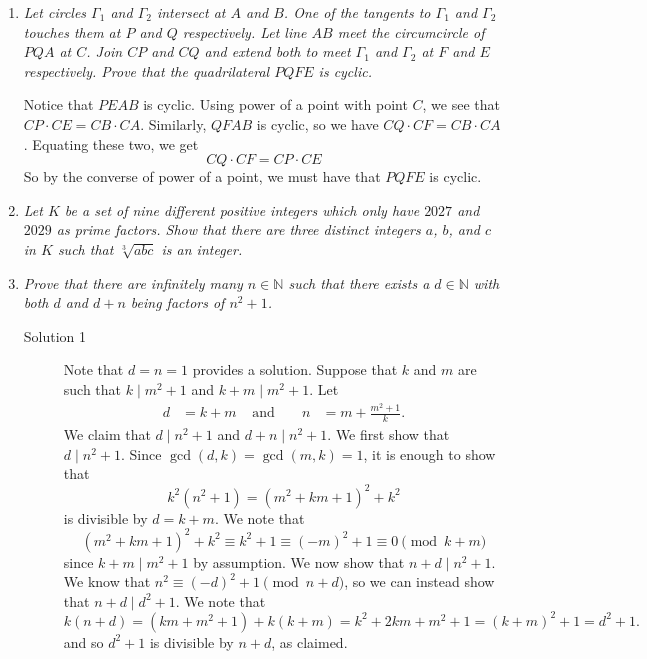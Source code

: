 \documentclass{article}
\begin{document}
\begin{enumerate}[1.]
  
  \item %
  {\itshape Let circles $\Gamma_1$ and $\Gamma_2$ intersect at $A$ and $B$. One of the tangents to $\Gamma_1$ and $\Gamma_2$ touches them at $P$ and $Q$ respectively. Let line $AB$ meet the circumcircle of $PQA$ at $C$. Join $CP$ and $CQ$ and extend both to meet $\Gamma_1$ and $\Gamma_2$ at $F$ and $E$ respectively. Prove that the quadrilateral $PQFE$ is cyclic.}
  
  Notice that $PEAB$ is cyclic. Using power of a point with point $C$, we see that $CP \cdot CE = CB \cdot CA$. Similarly, $QFAB$ is cyclic, so we have $CQ \cdot CF = CB \cdot CA$. Equating these two, we get 
  $$CQ \cdot CF = CP \cdot CE $$
  So by the converse of power of a point, we must have that $PQFE$ is cyclic.
  
  \item %
  {\itshape Let $K$ be a set of nine different positive integers which only have $2027$ and $2029$ as prime factors.
  Show that there are three distinct integers $a$, $b$, and $c$ in $K$ such that $\sqrt[3]{abc}$ is an integer.}
  
  
  \item %
  {\itshape Prove that there are infinitely many $n \in \mathbb{N}$ such that there exists a $d \in \mathbb{N}$ with both $d$ and $d + n$ being factors of $n^2 + 1$.}
  
  \begin{description}
    \item[Solution 1] Note that $d = n = 1$ provides a solution. Suppose that $k$ and $m$ are such that $k \mid m^2 + 1$ and $k + m \mid m^2 + 1$. Let
    \begin{align*}
      d & = k + m & \text{ and } && n & = m + \frac{m^2 + 1}{k}.
    \end{align*}
    We claim that $d \mid n^2 + 1$ and $d + n \mid n^2 + 1$. We first show that $d \mid n^2 + 1$. Since $\gcd(d, k) = \gcd(m, k) = 1$, it is enough to show that
    \[
      k^2 (n^2 + 1) = (m^2 + km + 1)^2 + k^2
    \]
    is divisible by $d = k + m$. We note that
    \[
      (m^2 + km + 1)^2 + k^2 \equiv k^2 + 1 \equiv (-m)^2 + 1 \equiv 0 \pmod{k + m}
    \]
    since $k + m \mid m^2 + 1$ by assumption. We now show that $n + d \mid n^2 + 1$. We know that $n^2 \equiv (-d)^2 + 1 \pmod{n + d}$, so we can instead show that $n + d \mid d^2 + 1$. We note that
    \[
      k(n + d) = (km + m^2 + 1) + k(k + m) = k^2 + 2km + m^2 + 1 = (k + m)^2 + 1 = d^2 + 1.
    \]
    and so $d^2 + 1$ is divisible by $n + d$, as claimed.


\end{description}
\end{enumerate}
\end{document}

